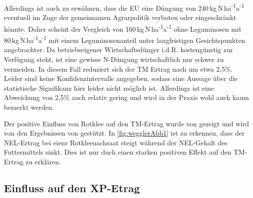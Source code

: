 Allerdings ist auch zu erwähnen, dass die \ac{EU} eine Düngung von 240\,kg\,N\,ha\textsuperscript{-1}a\textsuperscript{-1} eventuell im Zuge der gemeinsamen Agrarpolitik verboten oder eingeschränkt könnte.
Daher scheint der Vergleich von 160\,kg\,N\,ha\textsuperscript{-1}a\textsuperscript{-1} ohne Leguminosen mit 80\,kg\,N\,ha\textsuperscript{-1}a\textsuperscript{-1} mit einem Leguminosenanteil unter langfristigen Gesichtspunkten angebrachter.
Da betriebseigener Wirtschaftsdünger i.d.R. kostengünstig zur Verfügung steht, ist eine gewisse N-Düngung wirtschaftlich nur schwer zu vermeiden.
In diesem Fall reduziert sich der \ac{TM} Ertrag nach \textcite[11]{engel2013protein} um etwa 2,5\%.
Leider sind keine Konfidenzintervalle angegeben, sodass eine Aussage über die statistische Signifikanz hier leider nicht möglich ist.
Allerdings ist eine Abweichung von 2,5\% auch relativ gering und wird in der Praxis wohl auch kaum bemerkt werden.

Der positive Einfluss von Rotklee auf den \ac{TM}-Ertrag wurde von \textcite[242]{FrankowLindberg2009} gezeigt und wird von den Ergebnissen von \textcite[35]{weggler2050leguminosen} gestützt.
In \cref{fig:wegglerAbb1} ist zu erkennen, dass der \ac{NEL}-Ertrag bei eienr Rotkleenachsaat steigt während der \ac{NEL}-Gehalt des Futtermittels sinkt.
Dies ist nur duch einen starken positiven Effekt auf den \ac{TM}-Ertrag zu erklären.



\subsection{Einfluss auf den \acl{XP}-Etrag}
\label{subsec:Protein}

